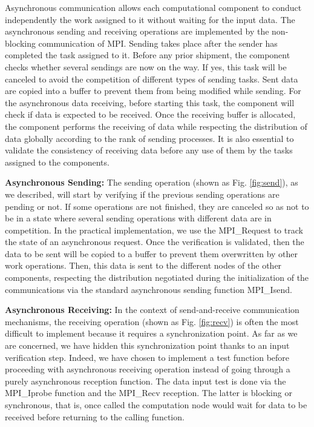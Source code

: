 Asynchronous communication allows each computational component to conduct independently the work assigned to it without waiting for the input data. The asynchronous sending and receiving operations are implemented by the non-blocking communication of MPI. Sending takes place after the sender has completed the task assigned to it. Before any prior shipment, the component checks whether several sendings are now on the way. If yes, this task will be canceled to avoid the competition of different types of sending tasks. Sent data are copied into a buffer to prevent them from being modified while sending. For the asynchronous data receiving, before starting this task, the component will check if data is expected to be received. Once the receiving buffer is allocated, the component performs the receiving of data while respecting the distribution of data globally according to the rank of sending processes. It is also essential to validate the consistency of receiving data before any use of them by the tasks assigned to the components.

\textbf{Asynchronous Sending:} The sending operation (shown as Fig. \ref{fig:send}), as we described, will start by verifying if the previous sending operations are pending or not. If some operations are not finished, they are canceled so as not to be in a state where several sending operations with different data are in competition. In the practical implementation, we use the MPI\_Request to track the state of an asynchronous request. Once the verification is validated, then the data to be sent will be copied to a buffer to prevent them overwritten by other work operations. Then, this data is sent to the different nodes of the other components, respecting the distribution negotiated during the initialization of the communications via the standard asynchronous sending function MPI\_Isend.


\textbf{Asynchronous Receiving:} In the context of send-and-receive communication mechanisms, the receiving operation (shown as Fig. \ref{fig:recv}) is often the most difficult to implement because it requires a synchronization point. As far as we are concerned, we have hidden this synchronization point thanks to an input verification step. Indeed, we have chosen to implement a test function before proceeding with asynchronous receiving operation instead of going through a purely asynchronous reception function. The data input test is done via the MPI\_Iprobe function and the MPI\_Recv reception. The latter is blocking or synchronous, that is, once called the computation node would wait for data to be received before returning to the calling function. 

